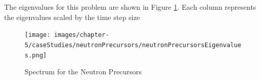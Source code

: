 The eigenvalues for this problem are shown in Figure \ref{fig:spectrum_neutron_precursors}. Each column represents the eigenvalues scaled by the time step size 


\clearpage

\begin{figure}
    \centering
    \texttt{[image: images/chapter-5/caseStudies/neutronPrecursors/neutronPrecursorsEigenvalues.png]}
    \caption{Spectrum for the Neutron Precursors}
    \label{fig:spectrum_neutron_precursors}
\end{figure}

\clearpage




